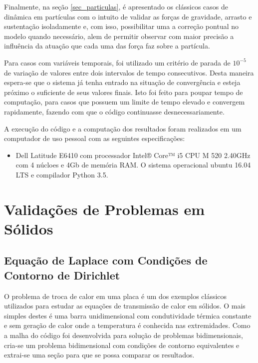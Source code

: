 Finalmente, na seção \ref{sec_particulas}, é apresentado os clássicos casos de dinâmica em partículas com o intuito de validar as forças de gravidade, arrasto e sustentação isoladamente e, com isso, possibilitar uma a correção pontual no modelo quando
necessário, alem de permitir observar com maior precisão a influência da atuação que cada uma das força faz sobre a partícula.

Para casos com variáveis temporais, foi utilizado um critério de parada de $10^{-5}$ de variação de valores entre dois intervalos de tempo consecutivos.
Desta maneira espera-se que o sistema já tenha entrado na situação de convergência e esteja próximo o suficiente de seus valores finais.
Isto foi feito para poupar tempo de computação, para casos que possuem um limite de tempo elevado e convergem rapidamente, fazendo com que o código continuasse desnecessariamente.

A execução do código e a computação dos resultados foram realizados em um computador de uso pessoal com as seguintes especificações:
\begin{itemize}
    \item Dell Latitude E6410 com processador Intel® Core™ i5 CPU M 520 2.40GHz com 4 núcloes e 4Gb de memória RAM.
          O sistema operacional ubuntu 16.04 LTS e compilador Python 3.5.
\end{itemize}


\section{\textbf{Validações de Problemas em Sólidos}}
\label{sec_solidos}
\subsection{\textbf{Equação de Laplace com Condições de Contorno de Dirichlet}}
\label{sec_laplace_dir}
O problema de troca de calor em uma placa é um dos exemplos clássicos utilizados para estudar as equações de transmissão de calor em sólidos. O mais simples destes é uma barra unidimensional com condutividade térmica constante e sem geração de calor onde a temperatura é conhecida nas extremidades.
Como a malha do código foi desenvolvida para solução de problemas bidimensionais, cria-se um problema bidimensional com condições de contorno equivalentes e extrai-se uma seção para que se possa comparar os resultados.

